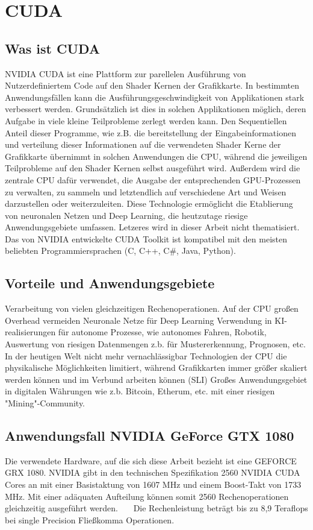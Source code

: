 
\section{CUDA}

\subsection{Was ist CUDA}

NVIDIA CUDA \cite{cuda-zone} ist eine Plattform zur parellelen Ausführung von Nutzerdefiniertem Code auf den Shader Kernen der Grafikkarte. In bestimmten Anwendungsfällen kann die Ausführungsgeschwindigkeit von Applikationen stark verbessert werden.
Grundsätzlich ist dies in solchen Applikationen möglich, deren Aufgabe in viele kleine Teilprobleme zerlegt werden kann. 
Den Sequentiellen Anteil dieser Programme, wie z.B. die bereitstellung der Eingabeinformationen und verteilung dieser Informationen auf die verwendeten Shader Kerne der Grafikkarte übernimmt in solchen Anwendungen die CPU, während die jeweiligen Teilprobleme auf den Shader Kernen selbst ausgeführt wird.
Außerdem wird die zentrale CPU dafür verwendet, die Ausgabe der entsprechenden GPU-Prozessen zu verwalten, zu sammeln und letztendlich auf verschiedene Art und Weisen darzustellen oder weiterzuleiten.
Diese Technologie ermöglicht die Etablierung von neuronalen Netzen und Deep Learning, die heutzutage riesige Anwendungsgebiete umfassen. Letzeres wird in dieser Arbeit nicht thematisiert.
Das von NVIDIA entwickelte CUDA Toolkit ist kompatibel mit den meisten beliebten Programmiersprachen (C, C++, C\#, Java, Python). 

\subsection{Vorteile und Anwendungsgebiete}

Verarbeitung von vielen gleichzeitigen Rechenoperationen.
Auf der CPU großen Overhead vermeiden
Neuronale Netze für Deep Learning
Verwendung in KI-realisierungen für autonome Prozesse, wie autonomes Fahren, Robotik, Auswertung von riesigen Datenmengen z.b. für Mustererkennung, Prognosen, etc.
In der heutigen Welt nicht mehr vernachlässigbar
Technologien der CPU die physikalische Möglichkeiten limitiert, während Grafikkarten immer größer skaliert werden können und im Verbund arbeiten können (SLI)
Großes Anwendungsgebiet in digitalen Währungen wie z.b. Bitcoin, Etherum, etc. mit einer riesigen "Mining"-Community.

\subsection{Anwendungsfall NVIDIA GeForce GTX 1080}
\label{sub:gtx1080}

Die verwendete Hardware, auf die sich diese Arbeit bezieht ist eine GEFORCE GRX 1080. NVIDIA gibt in den technischen Spezifikation \cite{gtx1080} 2560 NVIDIA CUDA Cores an mit einer Basistaktung von 1607 MHz und einem Boost-Takt von 1733 MHz.
Mit einer adäquaten Aufteilung können somit 2560 Rechenoperationen gleichzeitig ausgeführt werden. ~~~Die Rechenleistung beträgt bis zu 8,9 Teraflops bei single Precision Fließkomma Operationen.~~~